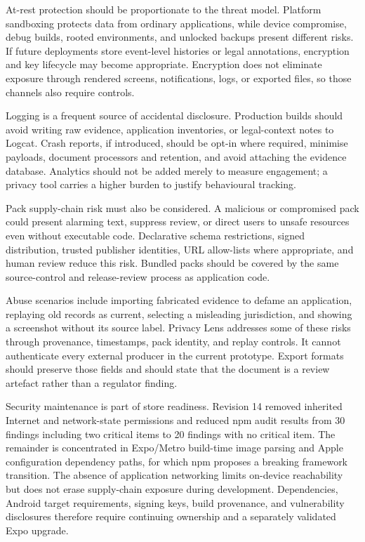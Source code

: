 At-rest protection should be proportionate to the threat model. Platform sandboxing protects data from ordinary applications, while device compromise, debug builds, rooted environments, and unlocked backups present different risks. If future deployments store event-level histories or legal annotations, encryption and key lifecycle may become appropriate. Encryption does not eliminate exposure through rendered screens, notifications, logs, or exported files, so those channels also require controls.

Logging is a frequent source of accidental disclosure. Production builds should avoid writing raw evidence, application inventories, or legal-context notes to Logcat. Crash reports, if introduced, should be opt-in where required, minimise payloads, document processors and retention, and avoid attaching the evidence database. Analytics should not be added merely to measure engagement; a privacy tool carries a higher burden to justify behavioural tracking.

Pack supply-chain risk must also be considered. A malicious or compromised pack could present alarming text, suppress review, or direct users to unsafe resources even without executable code. Declarative schema restrictions, signed distribution, trusted publisher identities, URL allow-lists where appropriate, and human review reduce this risk. Bundled packs should be covered by the same source-control and release-review process as application code.

Abuse scenarios include importing fabricated evidence to defame an application, replaying old records as current, selecting a misleading jurisdiction, and showing a screenshot without its source label. Privacy Lens addresses some of these risks through provenance, timestamps, pack identity, and replay controls. It cannot authenticate every external producer in the current prototype. Export formats should preserve those fields and should state that the document is a review artefact rather than a regulator finding.

Security maintenance is part of store readiness. Revision 14 removed inherited Internet and network-state permissions and reduced npm audit results from 30 findings including two critical items to 20 findings with no critical item. The remainder is concentrated in Expo/Metro build-time image parsing and Apple configuration dependency paths, for which npm proposes a breaking framework transition. The absence of application networking limits on-device reachability but does not erase supply-chain exposure during development. Dependencies, Android target requirements, signing keys, build provenance, and vulnerability disclosures therefore require continuing ownership and a separately validated Expo upgrade.

